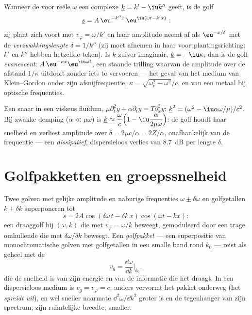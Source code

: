 \begin{definition}\label{def:b2:dispersion-wave-packets:complex}
Wanneer de  voor reële $\omega$ een complexe
$\underline k = k' - \iu k''$ geeft, is de golf
\[
\underline s = A\,\eu^{-k''x}\,\eu^{\iu(\omega t - k'x)} :
\]
zij plant zich voort met $v_\varphi = \omega/k'$ en haar amplitude neemt af
als $\eu^{-x/\delta}$ met de \emph{verzwakkingslengte} $\delta = 1/k''$ (zij
moet afnemen in haar voortplantingsrichting: $k'$ en $k''$ hebben hetzelfde
teken). Is $\underline k$ zuiver imaginair, $\underline k = -\iu\kappa$, dan
is de golf \emph{evanescent}: $A\,\eu^{-\kappa x}\eu^{\iu\omega t}$, een
staande trilling waarvan de amplitude over de afstand $1/\kappa$ uitdooft
zonder iets te vervoeren --- het geval van het medium van Klein--Gordon
onder zijn afsnijfrequentie, $\kappa = \sqrt{\omega_c^2 - \omega^2}/c$, en
van een metaal bij optische frequenties.
\end{definition}

\begin{example}\label{ex:b2:dispersion-wave-packets:damped}
Een snaar in een viskeus fluïdum,
$\mu\partial_t^2y + \alpha\partial_ty = T\partial_x^2y$:
$\underline k^2 = (\omega^2 - \iu\alpha\omega/\mu)/c^2$. Bij zwakke demping
($\alpha \ll \mu
\omega$) is
$\underline k \approx \dfrac\omega c\Bigl(1 - \iu\dfrac{\alpha}{2\mu\omega}\Bigr)$:
de golf houdt haar snelheid en verliest amplitude over
$\delta = 2\mu c/\alpha = 2Z/\alpha$, onafhankelijk van de frequentie ---
een \emph{dissipatief}, dispersieloos verlies van \qty{8.7}{dB} per lengte
$\delta$.
\end{example}

\section{Golfpakketten en groepssnelheid}

\begin{proposition}\label{prop:b2:dispersion-wave-packets:group}
Twee golven met gelijke amplitude en naburige frequenties
$\omega \pm
\delta\omega$ en golfgetallen $k \pm \delta k$ superponeren tot
\[
s = 2A\cos(\delta\omega\,t - \delta k\,x)\cos(\omega t - kx) :
\]
een draaggolf bij $(\omega, k)$ die met $v_\varphi = \omega/k$ beweegt,
gemoduleerd door een trage omhullende die met $\delta\omega/\delta k$
beweegt. Een \emph{golfpakket} --- een superpositie van monochromatische
golven met golfgetallen in een smalle band rond $k_0$ --- reist als geheel
met de \emph{}
\[
v_g = \frac{\dd\omega}{\dd k}\Bigr|_{k_0} ,
\]
die de snelheid is van zijn energie en van de informatie die het draagt. In
een dispersieloos medium is $v_g = v_\varphi = c$; anders vervormt het
pakket onderweg (het \emph{spreidt uit}), en wel sneller naarmate
$\dd^2\omega/\dd k^2$ groter is en de tegenhanger van zijn spectrum, zijn
ruimtelijke breedte, smaller.
\end{proposition}

